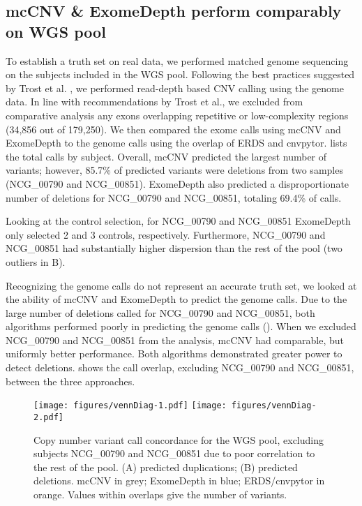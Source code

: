 \documentclass{article}\usepackage[]{graphicx}\usepackage[]{color}
\begin{document}
\subsection{mcCNV \& ExomeDepth perform comparably on WGS pool}

To establish a truth set on real data, we performed matched genome sequencing on the subjects included in the WGS pool.
Following the best practices suggested by Trost et al. \cite{trost:2018aa}, we performed read-depth based CNV calling using the genome data.
In line with recommendations by Trost et al., we excluded from comparative  analysis any exons overlapping repetitive or low-complexity regions (34,856 out of 179,250).
We then compared the exome calls using mcCNV and ExomeDepth to the genome calls using the overlap of ERDS and cnvpytor.
 lists the total calls by subject.
Overall, mcCNV predicted the largest number of variants; however, 85.7\% of predicted variants were deletions from two samples (NCG\_00790 and NCG\_00851).
ExomeDepth also predicted a disproportionate number of deletions for NCG\_00790 and NCG\_00851, totaling 69.4\% of calls.



Looking at the control selection, for NCG\_00790 and NCG\_00851 ExomeDepth only selected 2 and 3 controls, respectively.
Furthermore, NCG\_00790 and NCG\_00851 had substantially higher dispersion than the rest of the pool (two outliers in B).

Recognizing the genome calls do not represent an accurate truth set, we looked at the ability of mcCNV and ExomeDepth to predict the genome calls.
Due to the large number of deletions called for NCG\_00790 and NCG\_00851, both algorithms performed poorly in predicting the genome calls ().
When we excluded NCG\_00790 and NCG\_00851 from the analysis, mcCNV had comparable, but uniformly better performance.
Both algorithms demonstrated greater power to detect deletions.
 shows the call overlap, excluding NCG\_00790 and NCG\_00851, between the three approaches.



\begin{figure}
  \centering
  \texttt{[image: figures/vennDiag-1.pdf]}%
  \texttt{[image: figures/vennDiag-2.pdf]}
  \caption{Copy number variant call concordance for the WGS pool, excluding subjects NCG\_00790 and NCG\_00851 due to poor correlation to the rest of the pool. (A) predicted duplications; (B) predicted deletions. mcCNV in grey; ExomeDepth in blue; ERDS/cnvpytor in orange. Values within overlaps give the number of variants.}
  \label{fig:wgsVenn}
\end{figure}
\end{document}
